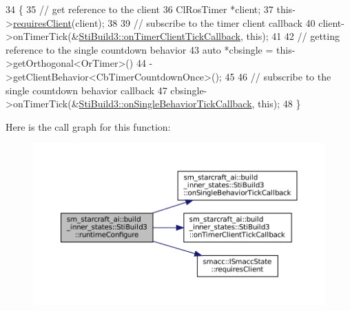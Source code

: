 \begin{DoxyCode}
34   \{
35     \textcolor{comment}{// get reference to the client}
36     ClRosTimer *client;
37     this->\hyperlink{classsmacc_1_1ISmaccState_a7f95c9f0a6ea2d6f18d1aec0519de4ac}{requiresClient}(client);
38 
39     \textcolor{comment}{// subscribe to the timer client callback}
40     client->onTimerTick(&\hyperlink{structsm__starcraft__ai_1_1build__inner__states_1_1StiBuild3_a73f1ba58018abc5a9c2ef617795d9987}{StiBuild3::onTimerClientTickCallback}, \textcolor{keyword}{this});
41 
42     \textcolor{comment}{// getting reference to the single countdown behavior}
43     \textcolor{keyword}{auto} *cbsingle = this->getOrthogonal<OrTimer>()
44                           ->getClientBehavior<CbTimerCountdownOnce>();
45 
46     \textcolor{comment}{// subscribe to the single countdown behavior callback}
47     cbsingle->onTimerTick(&\hyperlink{structsm__starcraft__ai_1_1build__inner__states_1_1StiBuild3_aa6963d70ef661d71e07be8218e29916f}{StiBuild3::onSingleBehaviorTickCallback}, \textcolor{keyword}{
      this});
48   \}
\end{DoxyCode}
Here is the call graph for this function\+:
\nopagebreak
\begin{figure}[H]
\begin{center}
\leavevmode
\includegraphics[width=350pt]{structsm__starcraft__ai_1_1build__inner__states_1_1StiBuild3_a8704c84513a0083bebca0cd42beed29b_cgraph}
\end{center}
\end{figure}
\mbox{\label{structsm__starcraft__ai_1_1build__inner__states_1_1StiBuild3_a20b4866fcfb1434d4cf862a5f511bbf8}} 
